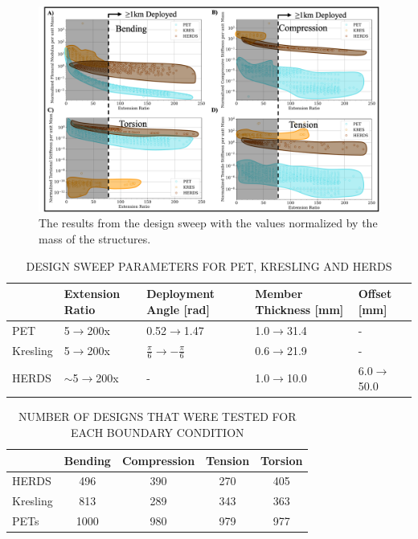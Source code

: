 \documentclass[11pt, a4paper]{article}
\begin{document}
\begin{figure}
    \centering
    \includegraphics[width=\linewidth]{Figures/Rebuttal/fig6_sup_rebuttal.png}
    \caption{The results from the design sweep with the values normalized by the mass of the structures.}
    \label{fig:norm_mass}
\end{figure}

\begin{table}[]
\centering
\caption{DESIGN SWEEP PARAMETERS FOR PET, KRESLING AND HERDS}
\begin{tabular}{@{}lllll@{}}
\toprule
         & Extension Ratio & Deployment Angle  [rad]& Member Thickness [mm]& Offset [mm]\\ \midrule
PET      & 5$\rightarrow$200x          &                  0.52$\rightarrow$1.47&                  1.0$\rightarrow$31.4& -      \\
Kresling & 5$\rightarrow$200x          &                  $\frac{\pi}{6} \rightarrow$$-\frac{\pi}{6}$&      0.6$\rightarrow$21.9& -      \\
HERDS    & $\sim$5$\rightarrow$200x    &                  -&                  1.0$\rightarrow$10.0&        6.0$\rightarrow$50.0\\ \bottomrule
\end{tabular}
\end{table}

\begin{table}[ht]
\centering
\caption{NUMBER OF DESIGNS THAT WERE TESTED FOR EACH BOUNDARY CONDITION}
\begin{tabular}{lcccc}
\toprule
 & Bending & Compression & Tension & Torsion \\
\midrule
HERDS & 496 & 390 & 270 & 405 \\
Kresling & 813 & 289 & 343 & 363 \\
PETs & 1000 & 980 & 979 & 977 \\
\bottomrule
\end{tabular}

\label{tab:file_counts}
\end{table}
\end{document}
